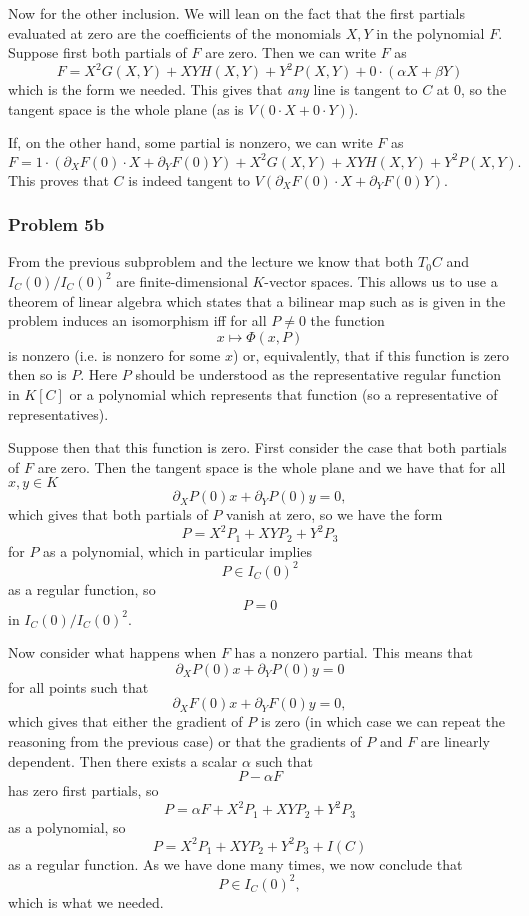 Now for the other inclusion. We will lean on the fact that the first partials
evaluated at zero are the coefficients of the monomials \( X, Y \) in the polynomial \( F \).
Suppose first both partials of \( F \) are zero.
Then we can write \( F \) as
\[ 
    F = X^2G(X,Y) + XY H(X,Y) + Y^2 P(X,Y) + 0 \cdot (\alpha X + \beta Y)
\]
which is the form we needed. This gives that \textit{any} line is tangent to \( C \)
at \( 0 \), so the tangent space is the whole plane (as is \( V(0 \cdot X + 0 \cdot Y) \)).

If, on the other hand, some partial is nonzero, we can write \( F \) as
\[ 
    F = 1 \cdot (\partial_X F (0) \cdot X  + \partial_Y F(0) Y) + X^2G(X,Y) +
    XY H(X,Y) + Y^2 P(X,Y).
\]
This proves that \( C \) is indeed tangent to \( V(\partial_X F (0) \cdot X  +
\partial_Y F(0) Y)\).

\subsubsection*{Problem 5b}

From the previous subproblem and the lecture we know that both \( T_0 C \)
and \( I_C (0) / I_C(0)^2 \) are finite-dimensional \( K \)-vector spaces.
This allows us to use a theorem of linear algebra which states that a bilinear map
such as is given in the problem induces an isomorphism iff for all \( P \neq 0 \)
the function
\[ 
    x \mapsto \Phi(x, P)
\]
is nonzero (i.e. is nonzero for some \( x \)) or, equivalently, that if this 
function is zero then so is \( P \). Here \( P \) should be understood as the
representative regular function in \( K[C] \) or a polynomial which represents
that function (so a representative of representatives).

Suppose then that this function is zero. First consider the case that both
partials of \( F \) are zero. Then the tangent space is the whole plane and
we have that for all \( x, y \in K \)
\[ 
    \partial_X P(0) x + \partial_Y P(0) y = 0,
\]
which gives that both partials of \( P \) vanish at zero, so we have the form
\[ 
    P = X^2 P_1 + XY P_2 + Y^2 P_3 
\]
for \( P \) as a polynomial, which in particular implies
\[ 
    P \in I_C(0)^2  
\]
as a regular function, so
\[ 
    P = 0 
\]
in \( I_C(0)/I_C(0)^2 \). 

Now consider what happens when \( F \) has a nonzero partial. This means that
\[ 
    \partial_X P(0) x + \partial_Y P(0) y = 0
\]
for all points such that
\[ 
    \partial_X F(0) x + \partial_Y F(0) y = 0,
\]
which gives that either the gradient of \( P \) is zero (in which case we can
repeat the reasoning from the previous case) or that the gradients of \( P \)
and \( F \) are linearly dependent. Then there exists a scalar \( \alpha \)
such that
\[ 
    P - \alpha F 
\]
has zero first partials, so
\[ 
    P = \alpha F + X^2 P_1 + XY P_2 + Y^2 P_3
\]
as a polynomial, so
\[ 
    P = X^2 P_1 + XY P_2 + Y^2 P_3 + I(C)
\]
as a regular function. As we have done many times, we now conclude that
\[ 
    P \in I_C(0)^2,
\]
which is what we needed.

